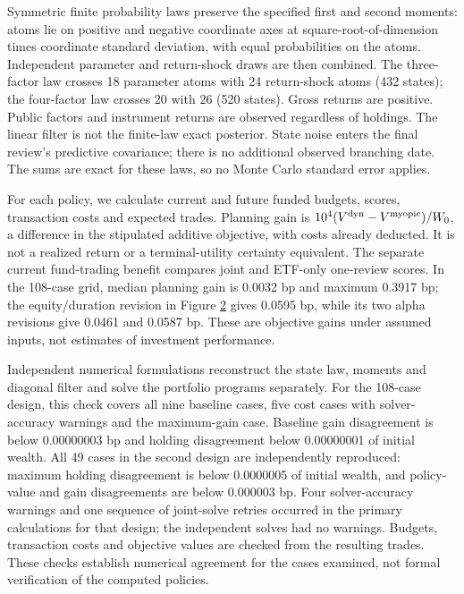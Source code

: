 \documentclass[11pt]{article}
\begin{document}
Symmetric finite probability laws preserve the specified first and second moments: atoms lie on positive and negative coordinate axes at square-root-of-dimension times coordinate standard deviation, with equal probabilities on the atoms. Independent parameter and return-shock draws are then combined. The three-factor law crosses 18 parameter atoms with 24 return-shock atoms (432 states); the four-factor law crosses 20 with 26 (520 states). Gross returns are positive. Public factors and instrument returns are observed regardless of holdings. The linear filter is not the finite-law exact posterior. State noise enters the final review's predictive covariance; there is no additional observed branching date. The sums are exact for these laws, so no Monte Carlo standard error applies.

For each policy, we calculate current and future funded budgets, scores, transaction costs and expected trades. Planning gain is \(10^4(V^{\rm dyn}-V^{\rm myopic})/W_0\), a difference in the stipulated additive objective, with costs already deducted. It is not a realized return or a terminal-utility certainty equivalent. The separate current fund-trading benefit compares joint and ETF-only one-review scores. In the 108-case grid, median planning gain is 0.0032 bp and maximum 0.3917 bp; the equity/duration revision in Figure \hyperref[fig:2]{2} gives 0.0595 bp, while its two alpha revisions give 0.0461 and 0.0587 bp. These are objective gains under assumed inputs, not estimates of investment performance.

Independent numerical formulations reconstruct the state law, moments and diagonal filter and solve the portfolio programs separately. For the 108-case design, this check covers all nine baseline cases, five cost cases with solver-accuracy warnings and the maximum-gain case. Baseline gain disagreement is below 0.00000003 bp and holding disagreement below 0.00000001 of initial wealth. All 49 cases in the second design are independently reproduced: maximum holding disagreement is below 0.0000005 of initial wealth, and policy-value and gain disagreements are below 0.000003 bp. Four solver-accuracy warnings and one sequence of joint-solve retries occurred in the primary calculations for that design; the independent solves had no warnings. Budgets, transaction costs and objective values are checked from the resulting trades. These checks establish numerical agreement for the cases examined, not formal verification of the computed policies.
\end{document}
